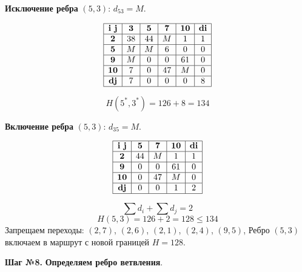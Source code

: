 \documentclass[17pt]{extarticle}
\begin{document}
\textbf{Исключение ребра} \((5,3)\): \( d_{53} = M \).

\[
    \begin{array}{|c|c|c|c|c|c|}
        \hline
        \textbf{i j} & \textbf{3} & \textbf{5} & \textbf{7} & \textbf{10} & \textbf{di} \\
        \hline
        \textbf{2}   & 38         & 44         & M          & 1           & 1           \\
        \hline
        \textbf{5}   & M          & M          & 6          & 0           & 0           \\
        \hline
        \textbf{9}   & M          & 0          & 0          & 61          & 0           \\
        \hline
        \textbf{10}  & 7          & 0          & 47         & M           & 0           \\
        \hline
        \textbf{dj}  & 7          & 0          & 0          & 0           & 8           \\
        \hline
    \end{array}
\]

\[ H(5^*,3^*) = 126 + 8 = 134 \]

\textbf{Включение ребра} \((5,3)\): \( d_{35} = M \).

\[
    \begin{array}{|c|c|c|c|c|}
        \hline
        \textbf{i j} & \textbf{5} & \textbf{7} & \textbf{10} & \textbf{di} \\
        \hline
        \textbf{2}   & 44         & M          & 1           & 1           \\
        \hline
        \textbf{9}   & 0          & 0          & 61          & 0           \\
        \hline
        \textbf{10}  & 0          & 47         & M           & 0           \\
        \hline
        \textbf{dj}  & 0          & 0          & 1           & 2           \\
        \hline
    \end{array}
\]

\[ \sum d_i + \sum d_j = 2 \]
\[ H(5,3) = 126 + 2 = 128 \leq 134 \]
Запрещаем переходы: \((2,7)\), \((2,6)\), \((2,1)\), \((2,4)\), \((9,5)\),
Ребро \((5,3)\) включаем в маршрут с новой границей \( H = 128 \).

\textbf{Шаг №8.}
\textbf{Определяем ребро ветвления}.
\end{document}
